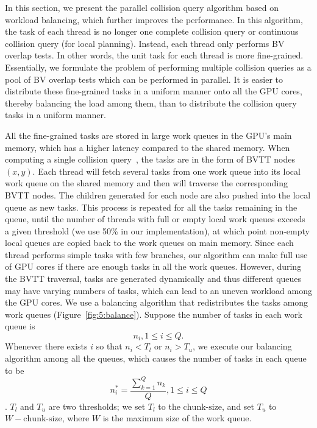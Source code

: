 In this section, we present the parallel collision query algorithm based on workload balancing, which further improves the performance. In this algorithm, the task of each thread is no longer one complete collision query or continuous collision query
(for local planning). Instead, each thread only performs BV overlap tests. In other words, the unit task for each thread is more fine-grained. 
Essentially, we formulate the problem of performing multiple collision queries as a pool of BV overlap tests which can be performed in parallel. It is easier to distribute these fine-grained tasks in a uniform manner onto all the GPU cores, thereby balancing the load among them, than to distribute the collision query tasks in a uniform manner.

All the fine-grained tasks are stored in large work queues in the GPU's main memory, which has a higher latency compared
to the shared memory. When computing a single collision query~\cite{Lauterbach10}, the tasks are in the form of
BVTT nodes $(x,y)$. Each thread will fetch several tasks from one work queue into its local work queue on the
shared memory and then will traverse the corresponding BVTT nodes. The children generated for each node are also pushed
into the local queue as new tasks. This process is repeated for all the tasks remaining in the queue,
until the number of threads with full or empty local work queues exceeds a given threshold (we use 50\%
in our implementation), at which point non-empty local queues are copied back to the work queues on main memory.
Since each thread performs simple tasks with few branches, our algorithm can make full use of GPU cores
if there are enough tasks in all the work queues. However, during the BVTT traversal, tasks
are generated dynamically and thus different queues may have varying numbers of tasks, which can lead to an uneven workload among the GPU cores. We use a balancing algorithm that redistributes the tasks among work queues (Figure~\ref{fig:5:balance}). Suppose the number of tasks in each work queue is $$n_i, 1\leq i \leq Q.$$ Whenever there exists $i$ so that $n_i < T_l$ or $n_i > T_u$, we execute our balancing algorithm among all the queues, which causes the number of tasks in each queue to be $$n_i^* = \frac{\sum_{k=1}^Q n_k}{Q}, 1\leq i \leq Q$$. $T_l$ and $T_u$ are two thresholds; we set $T_l$ to the $\text{chunk-size}$,
and set $T_u$ to $W-\text{chunk-size}$, where $W$ is the maximum size of the work queue.

